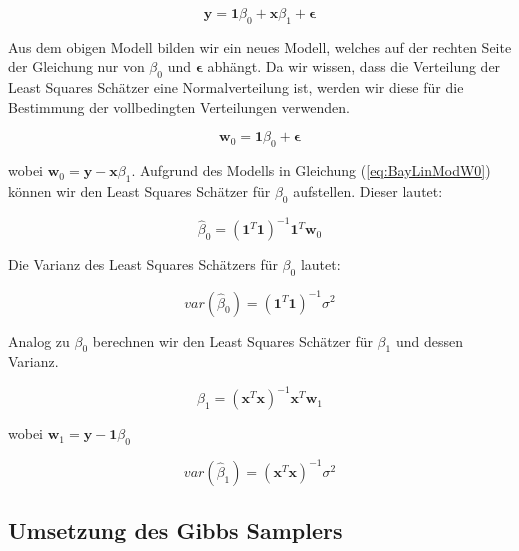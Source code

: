 \documentclass[]{book}
\begin{document}
\begin{equation}
\mathbf{y} = \mathbf{1}\beta_0 + \mathbf{x}\beta_1 + \mathbf{\epsilon}
\label{eq:BayLinModReform}
\end{equation}

Aus dem obigen Modell bilden wir ein neues Modell, welches auf der
rechten Seite der Gleichung nur von \(\beta_0\) und
\(\mathbf{\epsilon}\) abhängt. Da wir wissen, dass die Verteilung der
Least Squares Schätzer eine Normalverteilung ist, werden wir diese für
die Bestimmung der vollbedingten Verteilungen verwenden.

\begin{equation}
\mathbf{w}_0 = \mathbf{1}\beta_0 + \mathbf{\epsilon}
\label{eq:BayLinModW0}
\end{equation}

wobei \(\mathbf{w}_0 = \mathbf{y} - \mathbf{x}\beta_1\). Aufgrund des
Modells in Gleichung (\ref{eq:BayLinModW0}) können wir den Least Squares
Schätzer für \(\beta_0\) aufstellen. Dieser lautet:

\begin{equation}
\hat{\beta}_0 = (\mathbf{1}^T\mathbf{1})^{-1}\mathbf{1}^T\mathbf{w}_0
\label{eq:Beta0LsEst}
\end{equation}

Die Varianz des Least Squares Schätzers für \(\beta_0\) lautet:

\begin{equation}
var(\hat{\beta}_0) = (\mathbf{1}^T\mathbf{1})^{-1}\sigma^2
\label{eq:VarBeta0LsEst}
\end{equation}

Analog zu \(\beta_0\) berechnen wir den Least Squares Schätzer für
\(\beta_1\) und dessen Varianz.

\begin{equation}
\hat{\beta}_1 = (\mathbf{x}^T\mathbf{x})^{-1}\mathbf{x}^T\mathbf{w}_1
\label{eq:Beta1LsEst}
\end{equation}

wobei \(\mathbf{w}_1 = \mathbf{y} - \mathbf{1}\beta_0\)

\begin{equation}
var(\hat{\beta}_1) = (\mathbf{x}^T\mathbf{x})^{-1}\sigma^2
\label{eq:VarBeta1LsEst}
\end{equation}

\subsection{Umsetzung des Gibbs
Samplers}\label{umsetzung-des-gibbs-samplers}
\end{document}
